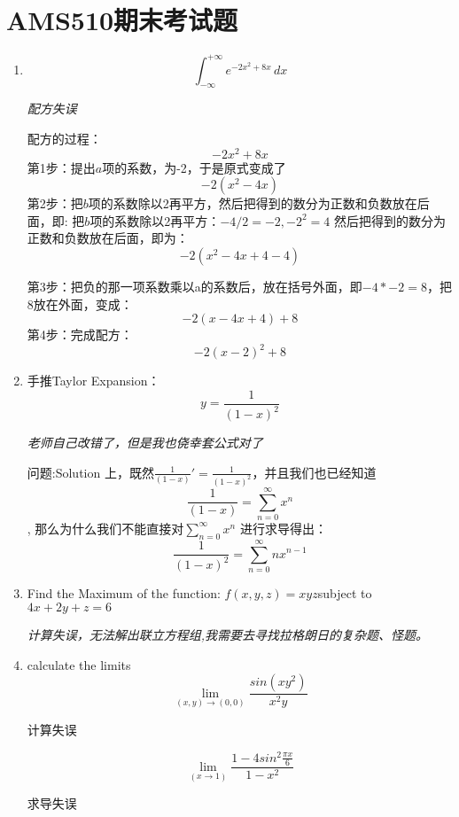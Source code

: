 \documentclass{ctexart}
\newcommand{\cbox}[2][yellow]{%
  \colorbox{#1}{\parbox{\dimexpr\linewidth-2\fboxsep}{\strut #2\strut}}%
}
\begin{document}
\pagestyle{empty}
\section{AMS510期末考试题}
\begin{enumerate}

    \item 
        \[ \int_{-\infty}^{+\infty} e^{-2x^2+8x} \,dx \]
    \cbox[gray!30]{\textsl{配方失误}}

    配方的过程：\[-2x^{2}+8x\]第1步：提出$a$项的系数，为-2，于是原式变成了\[-2(x^{2}-4x)\]第2步：把$b$项的系数除以2再平方，然后把得到的数分为正数和负数放在后面，即:
    \newline 把$b$项的系数除以2再平方：$-4/2=-2,-2^2=4$
    \newline 然后把得到的数分为正数和负数放在后面，即为：\[-2(x^{2}-4x+4-4)\]
    
    第3步：把负的那一项系数乘以a的系数后，放在括号外面，即$-4*-2=8$，把8放在外面，变成：\[-2(x-4x+4)+8\]第4步：完成配方：\[-2(x-2)^2+8\]
    
    \item 
     手推Taylor Expansion：\[y=\frac{1}{(1-x)^2}\]
     \cbox[gray!30]{\textsl{老师自己改错了，但是我也侥幸套公式对了}}
     问题:Solution 上，既然$\frac{1}{(1-x)}'=\frac{1}{(1-x)^2}$，并且我们也已经知道\[ \frac{1}{(1-x)}=\sum_{n=0}^{\infty} x^n\], 那么为什么我们不能直接对$\sum_{n=0}^{\infty} x^n$ 进行求导得出：\[ \frac{1}{(1-x)^2}= \sum_{n=0}^{\infty} nx^{n-1}\]

    \item 
    Find the Maximum of the function:\newline
    $f(x,y,z)=xyz$\qquad subject to \qquad$4x+2y+z=6$ \newline
    \cbox[gray!30]{\textsl{计算失误，无法解出联立方程组,我需要去寻找拉格朗日的复杂题、怪题。}}

    \item
    calculate the limits \[  \lim\limits_{(x,y)\rightarrow (0,0)}{\frac{sin(xy^{2})}{x^{2}y}} \]
    \cbox[gray!30]{计算失误} 
    \[  \lim\limits_{(x\rightarrow 1)}\frac{1-4sin^2{\frac{\pi x}{6}}}{1-x^2} \]
    \cbox[gray!30]{求导失误} 


\end{enumerate}
\end{document}

